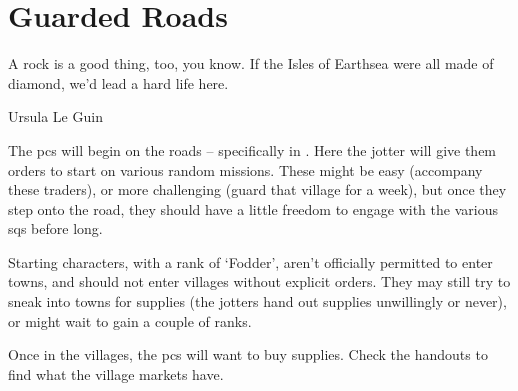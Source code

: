 \chapter{Guarded Roads}
\epigraph{A rock is a good thing, too, you know. If the Isles of Earthsea were all made of diamond, we'd lead a hard life here.}{Ursula Le Guin}

The \glspl{pc} will begin on the roads -- specifically in .
Here the \gls{jotter} will give them orders to start on various random missions.%
These might be easy (accompany these traders), or more challenging (guard that \gls{village} for a week), but once they step onto the road, they should have a little freedom to engage with the various \glspl{sq} before long.

Starting characters, with a rank of `Fodder',%
aren't officially permitted to enter towns, and should not enter \glspl{village} without explicit orders.
They may still try to sneak into towns for supplies (the \glspl{jotter} hand out supplies unwillingly or never), or might wait to gain a couple of ranks.

Once in the \glspl{village}, the \glspl{pc} will want to buy supplies.
Check the handouts to find what the \gls{village} markets have.
